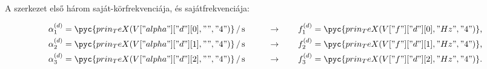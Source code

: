 A szerkezet első három saját-körfrekvenciája, és sajátfrekvenciája:
\begin{myframe}
  \begin{alignat}{9}
    \alpha_1^\d & = \pyc{prin_TeX(V["alpha"]["d"][0], "", "4")} \,/\, \mathrm{s}
    \qquad      & \rightarrow \qquad
    f_1^\d      & = \pyc{prin_TeX(V["f"]["d"][0], "Hz", "4")}
    \text,                                                                       \\
    \alpha_2^\d & = \pyc{prin_TeX(V["alpha"]["d"][1], "", "4")} \,/\, \mathrm{s}
    \qquad      & \rightarrow \qquad
    f_2^\d      & = \pyc{prin_TeX(V["f"]["d"][1], "Hz", "4")}
    \text,                                                                       \\
    \alpha_3^\d & = \pyc{prin_TeX(V["alpha"]["d"][2], "", "4")} \,/\, \mathrm{s}
    \qquad      & \rightarrow \qquad
    f_3^\d      & = \pyc{prin_TeX(V["f"]["d"][2], "Hz", "4")}
    \text.
  \end{alignat}
\end{myframe}
